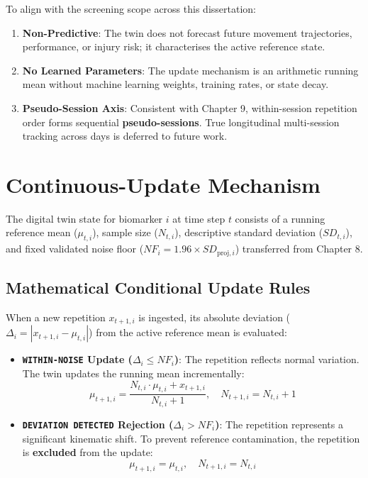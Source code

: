To align with the screening scope across this dissertation:
\begin{enumerate}
  \item \textbf{Non-Predictive}: The twin does not forecast future movement trajectories, performance, or injury risk; it characterises the active reference state.
  \item \textbf{No Learned Parameters}: The update mechanism is an arithmetic running mean without machine learning weights, training rates, or state decay.
  \item \textbf{Pseudo-Session Axis}: Consistent with Chapter 9, within-session repetition order forms sequential \textbf{pseudo-sessions}. True longitudinal multi-session tracking across days is deferred to future work.
\end{enumerate}



\section{Continuous-Update Mechanism}
\label{sec:11-2-continuous-update-mechanism}


The digital twin state for biomarker $i$ at time step $t$ consists of a running reference mean ($\mu_{t, i}$), sample size ($N_{t, i}$), descriptive standard deviation ($SD_{t, i}$), and fixed validated noise floor ($NF_i = 1.96 \times SD_{\text{proj}, i}$) transferred from Chapter 8.

\subsection{Mathematical Conditional Update Rules}
\label{sec:11-2-1-mathematical-conditional-update-rules}

When a new repetition $x_{t+1, i}$ is ingested, its absolute deviation ($\Delta_i = |x_{t+1, i} - \mu_{t, i}|$) from the active reference mean is evaluated:
\begin{itemize}
  \item \textbf{\texttt{WITHIN-NOISE} Update ($\Delta_i \le NF_i$)}: The repetition reflects normal variation. The twin updates the running mean incrementally:
\begin{equation}
  \mu_{t+1, i} = \frac{N_{t, i} \cdot \mu_{t, i} + x_{t+1, i}}{N_{t, i} + 1}, \quad N_{t+1, i} = N_{t, i} + 1
  \label{eq:disp1}
\end{equation}
  \item \textbf{\texttt{DEVIATION DETECTED} Rejection ($\Delta_i > NF_i$)}: The repetition represents a significant kinematic shift. To prevent reference contamination, the repetition is \textbf{excluded} from the update:
\begin{equation}
  \mu_{t+1, i} = \mu_{t, i}, \quad N_{t+1, i} = N_{t, i}
  \label{eq:disp2}
\end{equation}
\end{itemize}

